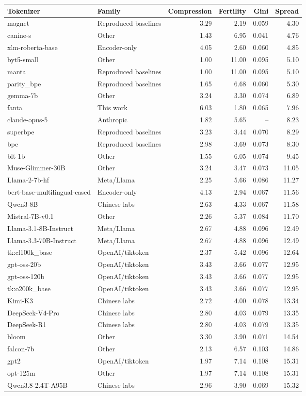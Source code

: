\begin{tabular}{llrrrr}
\toprule
Tokenizer & Family & Compression & Fertility & Gini & Spread \\
\midrule
magnet & Reproduced baselines & 3.29 & 2.19 & 0.059 & 4.30 \\
canine-s & Other & 1.43 & 6.95 & 0.041 & 4.76 \\
xlm-roberta-base & Encoder-only & 4.05 & 2.60 & 0.060 & 4.85 \\
byt5-small & Other & 1.00 & 11.00 & 0.095 & 5.10 \\
manta & Reproduced baselines & 1.00 & 11.00 & 0.095 & 5.10 \\
parity\_bpe & Reproduced baselines & 1.65 & 6.68 & 0.060 & 5.30 \\
gemma-7b & Other & 3.24 & 3.30 & 0.074 & 6.89 \\
fanta & This work & 6.03 & 1.80 & 0.065 & 7.96 \\
claude-opus-5 & Anthropic & 1.82 & 5.65 & -- & 8.23 \\
superbpe & Reproduced baselines & 3.23 & 3.44 & 0.070 & 8.29 \\
bpe & Reproduced baselines & 2.98 & 3.69 & 0.073 & 8.30 \\
blt-1b & Other & 1.55 & 6.05 & 0.074 & 9.45 \\
Muse-Glimmer-30B & Other & 3.24 & 3.47 & 0.073 & 11.05 \\
Llama-2-7b-hf & Meta/Llama & 2.25 & 5.66 & 0.086 & 11.27 \\
bert-base-multilingual-cased & Encoder-only & 4.13 & 2.94 & 0.067 & 11.56 \\
Qwen3-8B & Chinese labs & 2.63 & 4.33 & 0.067 & 11.58 \\
Mistral-7B-v0.1 & Other & 2.26 & 5.37 & 0.084 & 11.70 \\
Llama-3.1-8B-Instruct & Meta/Llama & 2.67 & 4.88 & 0.096 & 12.49 \\
Llama-3.3-70B-Instruct & Meta/Llama & 2.67 & 4.88 & 0.096 & 12.49 \\
tk:cl100k\_base & OpenAI/tiktoken & 2.37 & 5.42 & 0.096 & 12.64 \\
gpt-oss-20b & OpenAI/tiktoken & 3.43 & 3.66 & 0.077 & 12.95 \\
gpt-oss-120b & OpenAI/tiktoken & 3.43 & 3.66 & 0.077 & 12.95 \\
tk:o200k\_base & OpenAI/tiktoken & 3.43 & 3.66 & 0.077 & 12.95 \\
Kimi-K3 & Chinese labs & 2.72 & 4.00 & 0.078 & 13.34 \\
DeepSeek-V4-Pro & Chinese labs & 2.80 & 4.03 & 0.079 & 13.35 \\
DeepSeek-R1 & Chinese labs & 2.80 & 4.03 & 0.079 & 13.35 \\
bloom & Other & 3.30 & 3.90 & 0.071 & 14.54 \\
falcon-7b & Other & 2.13 & 6.57 & 0.103 & 14.86 \\
gpt2 & OpenAI/tiktoken & 1.97 & 7.14 & 0.108 & 15.31 \\
opt-125m & Other & 1.97 & 7.14 & 0.108 & 15.31 \\
Qwen3.8-2.4T-A95B & Chinese labs & 2.96 & 3.90 & 0.069 & 15.32 \\
\bottomrule
\end{tabular}